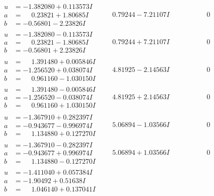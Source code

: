 \documentclass[1p]{elsarticle_modified}
\theoremstyle{definition}
\begin{document}
$$\begin{array}{c|c|c}
\begin{aligned}
u &= -1.382080 + 0.113573 I \\
a &= \phantom{-}0.23821 + 1.80685 I \\
b &= -0.56801 - 2.23826 I\end{aligned}
 & \phantom{-}0.79244 - 7.21107 I & \phantom{-0.000000 } 0 \\ \hline\begin{aligned}
u &= -1.382080 - 0.113573 I \\
a &= \phantom{-}0.23821 - 1.80685 I \\
b &= -0.56801 + 2.23826 I\end{aligned}
 & \phantom{-}0.79244 + 7.21107 I & \phantom{-0.000000 } 0 \\ \hline\begin{aligned}
u &= \phantom{-}1.391480 + 0.005846 I \\
a &= -1.256520 + 0.038074 I \\
b &= \phantom{-}0.961160 - 1.030150 I\end{aligned}
 & \phantom{-}4.81925 - 2.14563 I & \phantom{-0.000000 } 0 \\ \hline\begin{aligned}
u &= \phantom{-}1.391480 - 0.005846 I \\
a &= -1.256520 - 0.038074 I \\
b &= \phantom{-}0.961160 + 1.030150 I\end{aligned}
 & \phantom{-}4.81925 + 2.14563 I & \phantom{-0.000000 } 0 \\ \hline\begin{aligned}
u &= -1.367910 + 0.282397 I \\
a &= -0.943677 - 0.996974 I \\
b &= \phantom{-}1.134880 + 0.127270 I\end{aligned}
 & \phantom{-}5.06894 - 1.03566 I & \phantom{-0.000000 } 0 \\ \hline\begin{aligned}
u &= -1.367910 - 0.282397 I \\
a &= -0.943677 + 0.996974 I \\
b &= \phantom{-}1.134880 - 0.127270 I\end{aligned}
 & \phantom{-}5.06894 + 1.03566 I & \phantom{-0.000000 } 0 \\ \hline\begin{aligned}
u &= -1.411040 + 0.057384 I \\
a &= -1.90492 + 0.51638 I \\
b &= \phantom{-}1.046140 + 0.137041 I\end{aligned}

\end{array}$$
\end{document}
